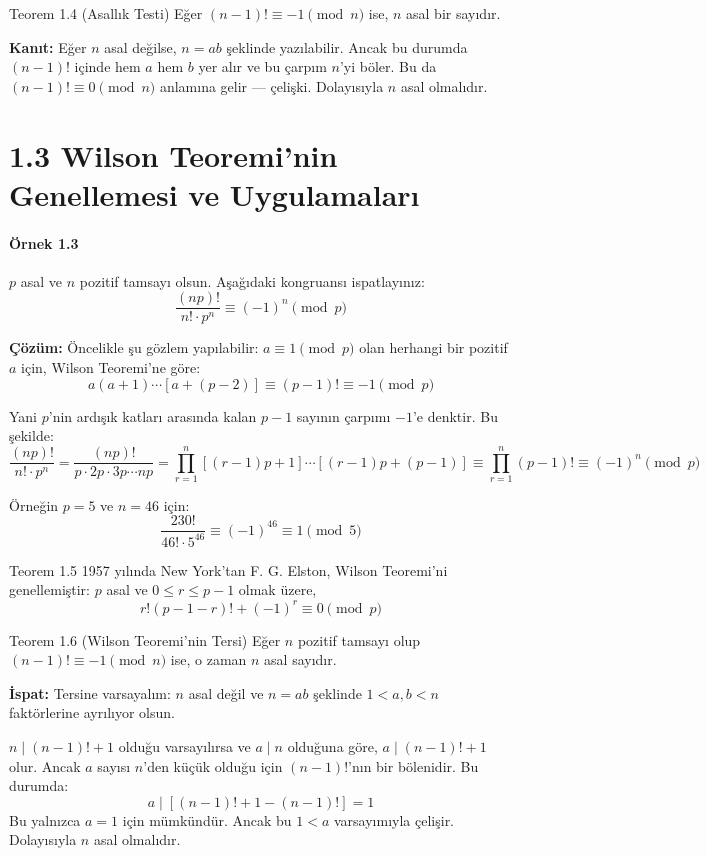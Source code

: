 \pagebreak %
\begin{theorembox}{Teorem 1.4 (Asallık Testi)}
Eğer $(n - 1)! \equiv -1 \pmod{n}$ ise, $n$ asal bir sayıdır.

\textbf{Kanıt:}  
Eğer $n$ asal değilse, $n = ab$ şeklinde yazılabilir. Ancak bu durumda $(n - 1)!$ içinde hem $a$ hem $b$ yer alır ve bu çarpım $n$'yi böler. Bu da $(n - 1)! \equiv 0 \pmod{n}$ anlamına gelir — çelişki. Dolayısıyla $n$ asal olmalıdır.
\end{theorembox}

\section*{1.3 Wilson Teoremi'nin Genellemesi ve Uygulamaları}

\paragraph{Örnek 1.3}  
$p$ asal ve $n$ pozitif tamsayı olsun. Aşağıdaki kongruansı ispatlayınız:
\[
\frac{(np)!}{n! \cdot p^n} \equiv (-1)^n \pmod{p}
\]

\textbf{Çözüm:}  
Öncelikle şu gözlem yapılabilir: $a \equiv 1 \pmod{p}$ olan herhangi bir pozitif $a$ için, Wilson Teoremi'ne göre:
\[
a(a + 1) \cdots [a + (p - 2)] \equiv (p - 1)! \equiv -1 \pmod{p}
\]

Yani $p$'nin ardışık katları arasında kalan $p - 1$ sayının çarpımı $-1$'e denktir. Bu şekilde:
\[
\frac{(np)!}{n! \cdot p^n} = \frac{(np)!}{p \cdot 2p \cdot 3p \cdots np}
= \prod_{r=1}^{n} [(r-1)p + 1] \cdots [(r-1)p + (p-1)]
\equiv \prod_{r=1}^{n} (p - 1)! \equiv (-1)^n \pmod{p}
\]

Örneğin $p = 5$ ve $n = 46$ için:
\[
\frac{230!}{46! \cdot 5^{46}} \equiv (-1)^{46} \equiv 1 \pmod{5}
\]

\begin{theorembox}{Teorem 1.5}
1957 yılında New York'tan F. G. Elston, Wilson Teoremi'ni genellemiştir:  
$p$ asal ve $0 \leq r \leq p - 1$ olmak üzere,
\[
r!(p - 1 - r)! + (-1)^r \equiv 0 \pmod{p}
\]
\end{theorembox}

\begin{theorembox}{Teorem 1.6 (Wilson Teoremi'nin Tersi)}
Eğer $n$ pozitif tamsayı olup $(n - 1)! \equiv -1 \pmod{n}$ ise, o zaman $n$ asal sayıdır.

\textbf{İspat:}  
Tersine varsayalım: $n$ asal değil ve $n = ab$ şeklinde $1 < a, b < n$ faktörlerine ayrılıyor olsun.

$n \mid (n - 1)! + 1$ olduğu varsayılırsa ve $a \mid n$ olduğuna göre, $a \mid (n - 1)! + 1$ olur.  
Ancak $a$ sayısı $n$'den küçük olduğu için $(n - 1)!$'nın bir bölenidir. Bu durumda:
\[
a \mid [(n - 1)! + 1 - (n - 1)!] = 1
\]
Bu yalnızca $a = 1$ için mümkündür. Ancak bu $1 < a$ varsayımıyla çelişir. Dolayısıyla $n$ asal olmalıdır.
\end{theorembox}

